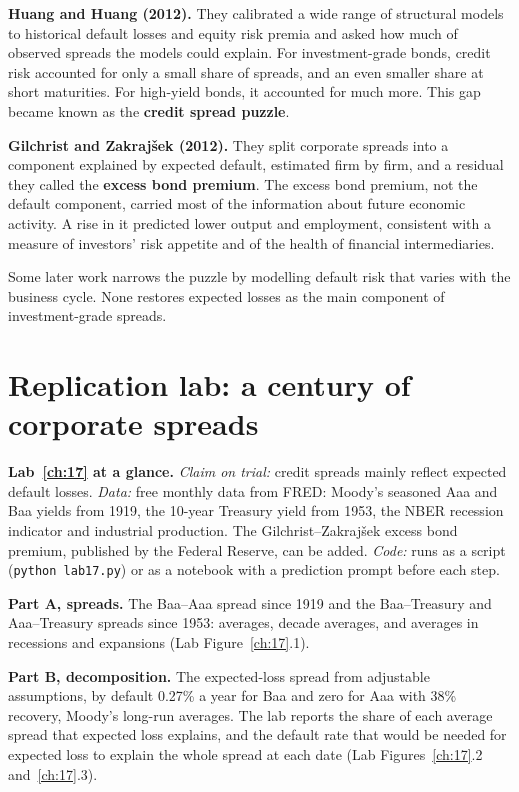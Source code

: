 \textbf{Huang and Huang (2012).} They calibrated a wide range of structural models to historical default losses and equity risk premia and asked how much of observed spreads the models could explain. For investment-grade bonds, credit risk accounted for only a small share of spreads, and an even smaller share at short maturities. For high-yield bonds, it accounted for much more. This gap became known as the \textbf{credit spread puzzle}.

\textbf{Gilchrist and Zakraj\v{s}ek (2012).} They split corporate spreads into a component explained by expected default, estimated firm by firm, and a residual they called the \textbf{excess bond premium}. The excess bond premium, not the default component, carried most of the information about future economic activity. A rise in it predicted lower output and employment, consistent with a measure of investors' risk appetite and of the health of financial intermediaries.

Some later work narrows the puzzle by modelling default risk that varies with the business cycle. None restores expected losses as the main component of investment-grade spreads.

\section{Replication lab: a century of corporate spreads}
\label{sec:17-lab}

\begin{callout}
\textbf{Lab~\ref{ch:17} at a glance.} \emph{Claim on trial:} credit spreads mainly reflect expected default losses. \emph{Data:} free monthly data from FRED: Moody's seasoned Aaa and Baa yields from 1919, the 10-year Treasury yield from 1953, the NBER recession indicator and industrial production. The Gilchrist--Zakraj\v{s}ek excess bond premium, published by the Federal Reserve, can be added. \emph{Code:} runs as a script (\texttt{python lab17.py}) or as a notebook with a prediction prompt before each step.
\end{callout}

\textbf{Part A, spreads.} The Baa--Aaa spread since 1919 and the Baa--Treasury and Aaa--Treasury spreads since 1953: averages, decade averages, and averages in recessions and expansions (Lab Figure~\ref{ch:17}.1).

\textbf{Part B, decomposition.} The expected-loss spread from adjustable assumptions, by default 0.27\% a year for Baa and zero for Aaa with 38\% recovery, Moody's long-run averages. The lab reports the share of each average spread that expected loss explains, and the default rate that would be needed for expected loss to explain the whole spread at each date (Lab Figures~\ref{ch:17}.2 and~\ref{ch:17}.3).

